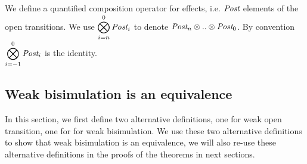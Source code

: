 \documentclass{lmcs}
\begin{document}
We  define a quantified composition operator for effects, i.e. $\Post$ elements of the open transitions.
We use ${\displaystyle \bigotimes_{i=n}^{0} \Post_i}$ to denote  $\Post_n\otimes .. \otimes \Post_0$. By convention ${\displaystyle \bigotimes_{i=-1}^{0} \Post_i}$ is the identity. 



\subsection{Weak bisimulation is an equivalence}\label{app-WFH-equiv}

In this section, we first define two alternative definitions, one for weak open transition, one for for weak bisimulation. We use these two alternative definitions to show that weak bisimulation is an equivalence, we will also re-use these alternative definitions in the  proofs of the theorems in next sections.
\end{document}
